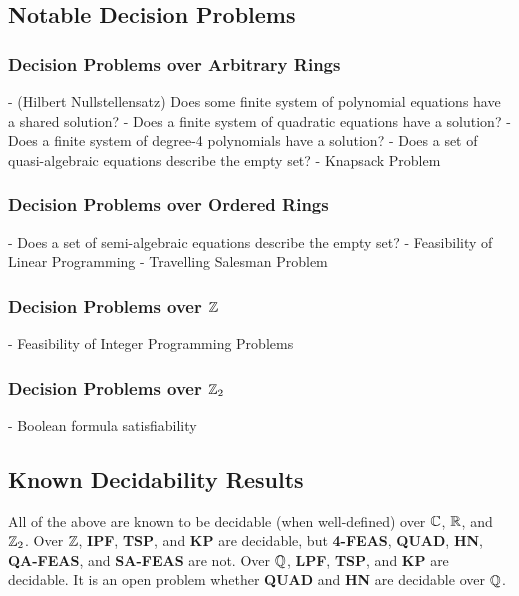   \subsection{Notable Decision Problems}

  \begin{itemize}
    \subsubsection{Decision Problems over Arbitrary Rings}
     - (Hilbert Nullstellensatz) Does some finite system
    of polynomial equations have a shared solution?  
     - Does a finite system of quadratic equations have a solution?
     - Does a finite system of degree-4 polynomials have a solution?  
     - Does a set of quasi-algebraic equations describe the empty set?  
     - Knapsack Problem
    
    \subsubsection{Decision Problems over Ordered Rings}
     - Does a set of semi-algebraic equations describe the empty set?
     - Feasibility of Linear Programming
     - Travelling Salesman Problem
    
    \subsubsection{Decision Problems over $\mathbb{Z}$}
     - Feasibility of Integer Programming Problems

    \subsubsection{Decision Problems over $\mathbb{Z}_2$}
     - Boolean formula satisfiability


  \end{itemize}

  \subsection{Known Decidability Results}

  All of the above are known to be decidable (when well-defined) over
  $\mathbb{C}$, $\mathbb{R}$, and $\mathbb{Z}_2$.  Over $\mathbb{Z}$,
  \textbf{IPF}, \textbf{TSP}, and \textbf{KP} are decidable, but
  \textbf{4-FEAS}, \textbf{QUAD}, \textbf{HN}, \textbf{QA-FEAS}, and
  \textbf{SA-FEAS} are not.  Over $\mathbb{Q}$, \textbf{LPF},
  \textbf{TSP}, and \textbf{KP} are decidable.  It is an open problem
  whether \textbf{QUAD} and \textbf{HN} are decidable over $\mathbb{Q}$.

